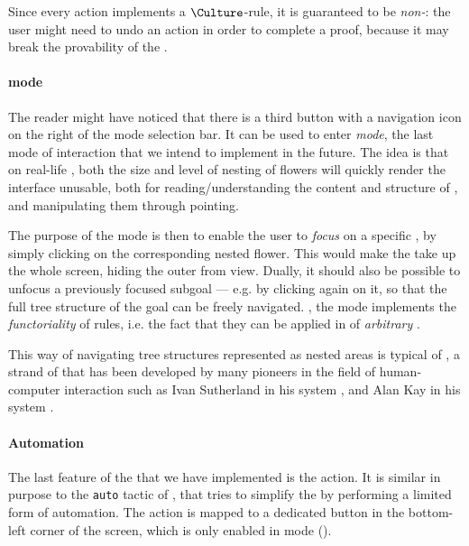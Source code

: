 \begin{scope}
Since every \Edit action implements a $\Culture$-rule, it is guaranteed to be
\emph{non-}: the user might need to undo an \Edit action in order to
complete a proof, because it may break the provability of the .

\paragraph{\Navigation mode}

The reader might have noticed that there is a third button with a navigation
icon on the right of the mode selection bar. It can be used to enter
\emph{\Navigation mode}, the last mode of interaction that we intend to implement
in the future. The idea is that on real-life , both the size and level of
nesting of flowers will quickly render the interface unusable, both for
reading/understanding the content and structure of , and manipulating them
through pointing.

The purpose of the \Navigation mode is then to enable the user to \emph{focus} on
a specific , by simply clicking on the corresponding nested flower. This
would make the  take up the whole screen, hiding the outer  from
view. Dually, it should also be possible to unfocus a previously focused subgoal
--- e.g. by clicking again on it, so that the full tree structure of the goal
can be freely navigated. , the \Navigation mode implements the
\emph{functoriality} of rules, i.e. the fact that they can be applied in
 of \emph{arbitrary} .

\begin{remark}
This way of navigating tree structures represented as nested areas is typical of
, a strand of  that has been developed by
many pioneers in the field of human-computer interaction such as Ivan Sutherland
in his  system , and Alan Kay
in his  system .
\end{remark}

\paragraph{Automation}

The last feature of the  that we have implemented is the
 \Proof action. It is similar in purpose to the \texttt{auto}
tactic of , that tries to simplify the  by performing a limited form of
automation. The  action is mapped to a dedicated button in the
bottom-left corner of the screen, which is only enabled in \Proof mode
().


\end{scope}
